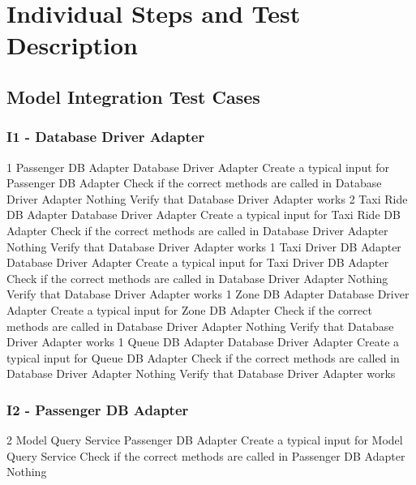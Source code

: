 \section{Individual Steps and Test Description}

\subsection{Model Integration Test Cases}
\subsubsection{I1 - Database Driver Adapter}
\testCase
	{1}
	{Passenger DB Adapter}
	{Database Driver Adapter}
	{Create a typical input for Passenger DB Adapter}
	{Check if the correct methods are called in Database Driver Adapter}
	{Nothing}
	{Verify that Database Driver Adapter works}
\testCase
	{2}
	{Taxi Ride DB Adapter}
	{Database Driver Adapter}
	{Create a typical input for Taxi Ride DB Adapter}
	{Check if the correct methods are called in Database Driver Adapter}
	{Nothing}
	{Verify that Database Driver Adapter works}
\testCase
	{1}
	{Taxi Driver DB Adapter}
	{Database Driver Adapter}
	{Create a typical input for Taxi Driver DB Adapter}
	{Check if the correct methods are called in Database Driver Adapter}
	{Nothing}
	{Verify that Database Driver Adapter works}
\testCase
	{1}
	{Zone DB Adapter}
	{Database Driver Adapter}
	{Create a typical input for Zone DB Adapter}
	{Check if the correct methods are called in Database Driver Adapter}
	{Nothing}
	{Verify that Database Driver Adapter works}
\testCase
	{1}
	{Queue DB Adapter}
	{Database Driver Adapter}
	{Create a typical input for Queue DB Adapter}
	{Check if the correct methods are called in Database Driver Adapter}
	{Nothing}
	{Verify that Database Driver Adapter works}
\subsubsection{I2 - Passenger DB Adapter}
\testCase
	{2}
	{Model Query Service}
	{Passenger DB Adapter}
	{Create a typical input for Model Query Service}
	{Check if the correct methods are called in Passenger DB Adapter}
	{Nothing}
	{}
